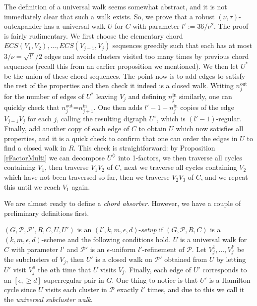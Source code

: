 \documentclass[10pt,letterpaper, reqno]{amsart}
\theoremstyle{definition}
\numberwithin{equation}{section}
\begin{document}
The definition of a universal walk seems somewhat abstract, and it is not immediately clear that such a walk exists. So, we prove that a robust $(\nu,\tau)$-outexpander has a universal walk $U$ for $C$ with parameter $l':=36/\nu^2$. The proof is fairly rudimentary. We first choose the elementary chord $ECS(V_1,V_2), \dots, ECS(V_{j-1},V_j)$ sequences greedily such that each has at most $3/\nu = \sqrt{l'}/2$ edges and avoids clusters visited too many times by previous chord sequences (recall this from an earlier proposition we mentioned). We then let $U^*$ be the union of these chord sequences. The point now is to add edges to satisfy the rest of the properties and then check it indeed is a closed walk. Writing $n_j^\text{out}$ for the number of edges of $U^*$ leaving $V_j$ and defining $n_j^\text{in}$ similarly, one can quickly check that $n_j^\text{out}$=$n_{j+1}^\text{in}$. One then adds $l'-1-n_j^\text{in}$ copies of the edge $V_{j-1}V_j$ for each $j$, calling the resulting digraph $U^\diamond$, which is $(l'-1)$-regular. Finally, add another copy of each edge of $C$ to obtain $U$ which now satisfies all properties, and it is a quick check to confirm that one can order the edges in $U$ to find a closed walk in $R$. This check is straightforward: by Proposition \ref{rFactorMulti} we can decompose $U^\diamondsuit$ into 1-factors, we then traverse all cycles containing $V_1$, then traverse $V_1V_2$ of $C$, next we traverse all cycles containing $V_2$ which have not been traversed so far, then we traverse $V_2V_3$ of $C$, and we repeat this until we reach $V_1$ again. 

We are almost ready to define a \textit{chord absorber}. However, we have a couple of preliminary definitions first. 

$(G,\mathcal{P},\mathcal{P}', R,C,U,U')$ is an $(l', k , m, \epsilon, d)$-\textit{setup} if $(G, \mathcal{P},R,C)$ is a $(k,m,\epsilon,d)$-scheme and the following conditions hold. $U$ is a universal walk for $C$ with parameter $l'$ and $\mathcal{P}'$ is an $\epsilon$-uniform $l'$-refinement of $\mathcal{P}$. Let $V_j^1, \dots, V_j^{l'}$ be the subclusters of $V_j$, then $U'$ is a closed walk on $\mathcal{P}'$ obtained from $U$ by letting $U'$ visit $V^a_j$ the $a$th time that $U$ visits $V_j$. Finally, each edge of $U'$ corresponds to an $[\epsilon, \geq d]$-superregular pair in $G$. One thing to notice is that $U'$ is a Hamilton cycle since $U$ visits each cluster in $\mathcal{P}$ exactly $l'$ times, and due to this we call it the \textit{universal subcluster walk}. 
\end{document}
